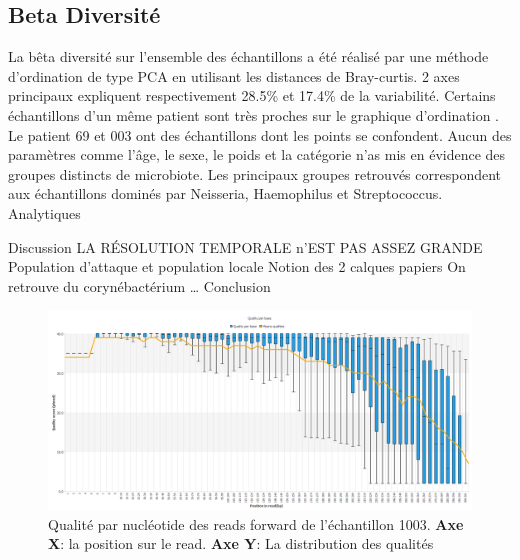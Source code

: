 \documentclass[12pt,a4paper]{article}
\begin{document}
\subsection{Beta Diversité}
La bêta diversité sur l’ensemble des échantillons a été réalisé par une méthode d’ordination de type PCA en utilisant les distances de Bray-curtis.
2 axes principaux expliquent respectivement 28.5\% et 17.4\% de la variabilité.
Certains échantillons d’un même patient sont très proches sur le graphique d’ordination . Le patient 69 et 003 ont des échantillons dont les points se confondent.
Aucun des paramètres comme l’âge, le sexe, le poids et la catégorie n’as mis en évidence des groupes distincts de microbiote.
Les principaux groupes retrouvés correspondent aux échantillons dominés par Neisseria, Haemophilus et Streptococcus.
Analytiques


Discussion
LA RÉSOLUTION TEMPORALE n’EST PAS ASSEZ GRANDE
Population d’attaque et population locale
Notion des 2 calques papiers
On retrouve du corynébactérium …
Conclusion







\begin{figure}[ht]
\begin{center}
\includegraphics[scale=0.45]{img/1003_forward.png}\hfill
\end{center}
\caption{Qualité par nucléotide des reads forward de l'échantillon 1003. \textbf{Axe X}: la position sur le read. \textbf{Axe Y}: La distribution des qualités}
\label{fastqcquality}
\end{figure}
\end{document}
